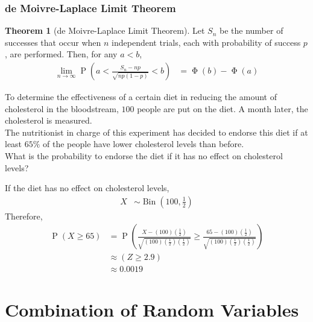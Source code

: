 \documentclass[titlepage, fleqn, a4paper, 12pt, twoside]{article}
\theoremstyle{definition}
\theoremstyle{theorem}
\newtheorem{theorem}{Theorem}
\DeclareMathOperator{\prob}{\mathrm{P}}
\DeclareMathOperator{\stdnormalcdf}{\mathrm{\Phi}}
\DeclareMathOperator{\bin}{\mathrm{Bin}}
\begin{document}
\section{de Moivre-Laplace Limit Theorem}

\begin{theorem}[de Moivre-Laplace Limit Theorem]
	Let $S_n$ be the number of successes that occur when $n$ independent trials, each with probability of success $p$, are performed.
	Then, for any $a < b$,
	\begin{align*}
		\lim\limits_{n \to \infty} \prob\left( a < \frac{S_n - n p}{\sqrt{n p (1 - p)}} < b \right) &= \stdnormalcdf(b) - \stdnormalcdf(a)
	\end{align*}
\end{theorem}

\begin{question}
	To determine the effectiveness of a certain diet in reducing the amount of cholesterol in the bloodstream, $100$ people are put on the diet.
	A month later, the cholesterol is measured.\\
	The nutritionist in charge of this experiment has decided to endorse this diet if at least $65\%$ of the people have lower cholesterol levels than before.\\
	What is the probability to endorse the diet if it has no effect on cholesterol levels?
\end{question}

\begin{solution}
	If the diet has no effect on cholesterol levels,
	\begin{align*}
		X &\sim \bin\left( 100,\frac{1}{2} \right)
	\end{align*}
	Therefore,
	\begin{align*}
		\prob(X \ge 65) &= \prob\left( \frac{X - (100) \left( \frac{1}{2} \right)}{\sqrt{(100) \left( \frac{1}{2} \right) \left( \frac{1}{2} \right)}} \ge \frac{65 - (100) \left( \frac{1}{2} \right)}{\sqrt{(100) \left( \frac{1}{2} \right) \left( \frac{1}{2} \right)}} \right)\\
		&\approx (Z \ge 2.9)\\
		&\approx 0.0019
	\end{align*}
\end{solution}

\clearpage
\part{Combination of Random Variables}
\end{document}
